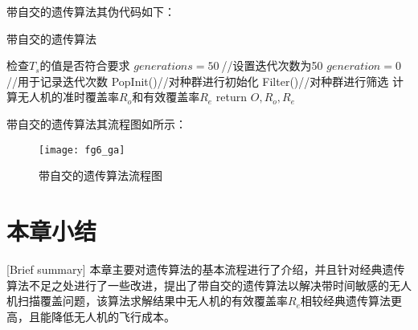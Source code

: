带自交的遗传算法其伪代码如下：


\begin{algorithm}[H]  %
	\caption{带自交的遗传算法}%
	\LinesNumbered %
	检查$T_s$的值是否符合要求\; %
	$generations = 50~$//设置迭代次数为50\;
	$generation = 0~$//用于记录迭代次数\;
	PopInit()//对种群进行初始化\;
	Filter()//对种群进行筛选\;
	计算无人机的准时覆盖率$R_o$和有效覆盖率$R_e$\;
	return $O,R_o,R_e$
	
\end{algorithm}


带自交的遗传算法其流程图如所示：
\begin{figure}[H]
	\centering
	\texttt{[image: fg6\_ga]}
	\caption{带自交的遗传算法流程图}
	\label{fg403}
\end{figure}

\section{本章小结}[Brief summary]
本章主要对遗传算法的基本流程进行了介绍，并且针对经典遗传算法不足之处进行了一些改进，提出了带自交的遗传算法以解决带时间敏感的无人机扫描覆盖问题，该算法求解结果中无人机的有效覆盖率$R_e$相较经典遗传算法更高，且能降低无人机的飞行成本。